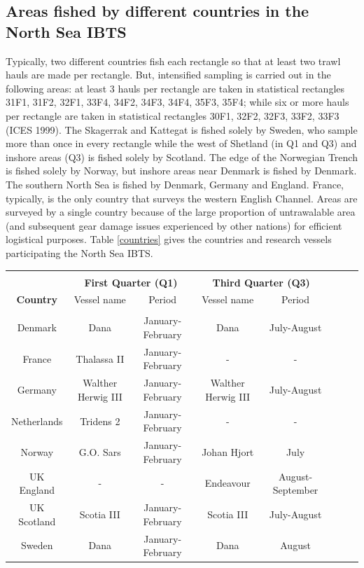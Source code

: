 \documentclass[a4paper 12pt]{article}
\numberwithin{equation}{section}
\begin{document}
\begin{appendices}
\section{\large Areas fished by different countries in the North Sea IBTS}
\label{areasfishedappendix}
Typically, two different countries fish each rectangle so that at least two trawl hauls are made per rectangle. But, intensified sampling is carried out in the following areas: at least 3 hauls per rectangle are taken in statistical rectangles  31F1, 31F2, 32F1, 33F4, 34F2, 34F3, 34F4, 35F3, 35F4; while six or more hauls per rectangle are taken in statistical rectangles  30F1, 32F2, 32F3, 33F2, 33F3 (ICES 1999).  The Skagerrak and Kattegat is fished solely by Sweden, who sample more than once in every rectangle while the west of Shetland (in Q1 and Q3) and inshore areas (Q3) is fished solely by Scotland. The edge of the Norwegian Trench is fished solely by Norway, but inshore areas near Denmark is fished by Denmark. The southern North Sea is fished by Denmark, Germany and England. France, typically, is the only country that surveys the western English Channel. Areas are surveyed by a single country because of the large proportion of untrawalable area (and subsequent gear damage issues experienced by other nations)  for efficient logistical purposes. Table \ref{countries} gives the countries and research vessels participating the North Sea IBTS.\\
\begin{small}
\begin{table}[h!]
\centering
{}
\begin{tabular}{cccccccc}
\hline \\[0.1ex]
  & \multicolumn{2}{c}{\bf First Quarter (Q1)} & \multicolumn{2}{c}{\bf Third Quarter (Q3)}\\[1.5ex]
{\bf Country }  & Vessel name & Period    & Vessel name & Period  \\[0.5ex]
\hline \\[0.5ex]
Denmark  &   Dana   &   January-February  & Dana & July-August    \\[1ex]
France  & Thalassa II & January-February & - & -   \\[1ex]
Germany   &  Walther  Herwig III & January-February   &   Walther  Herwig III & July-August \\[1ex]
Netherlands &  Tridens 2 &  January-February   & - & -     \\[1ex]
Norway  &   G.O. Sars  & January-February &    Johan Hjort  & July   \\[1ex]
UK England &- & -&  Endeavour &  August-September  \\[1ex]
UK Scotland   &  Scotia III &  January-February & Scotia III &  July-August \\[1ex]
Sweden  &  Dana &  January-February  &  Dana &  August                  \\[0.5ex]
\hline
\end{tabular}
\end{table}
\end{small}


\end{appendices}
\end{document}
